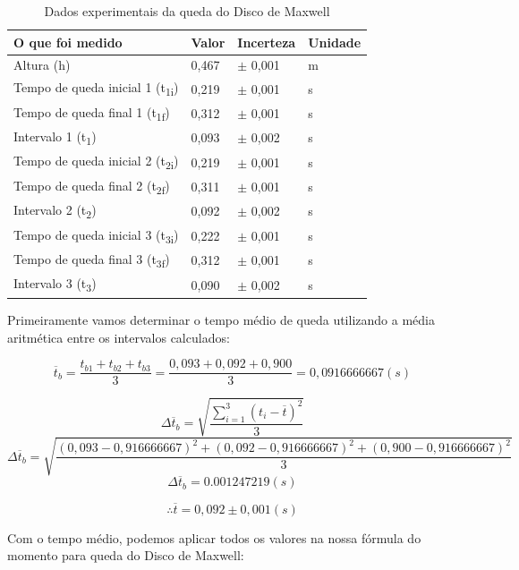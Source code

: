 \begin{table}[H]
    \centering
    \begin{tabular}{ |p{6cm}||p{2cm}||p{2cm}||p{2cm}|  }
        \hline
        \textbf{O que foi medido} & \textbf{Valor} & \textbf{Incerteza} & \textbf{Unidade}\\
        \hline
        Altura (h)                                      & 0,467 & $\pm$ 0,001 & m\\
        Tempo de queda inicial 1 (t\textsubscript{1i})  & 0,219 & $\pm$ 0,001 & s\\
        Tempo de queda final 1 (t\textsubscript{1f})    & 0,312 & $\pm$ 0,001 & s\\
        Intervalo 1 (t\textsubscript{1})                & 0,093 & $\pm$ 0,002 & s\\
        Tempo de queda inicial 2 (t\textsubscript{2i})  & 0,219 & $\pm$ 0,001 & s\\
        Tempo de queda final 2 (t\textsubscript{2f})    & 0,311 & $\pm$ 0,001 & s\\
        Intervalo 2 (t\textsubscript{2})                & 0,092 & $\pm$ 0,002 & s\\
        Tempo de queda inicial 3 (t\textsubscript{3i})  & 0,222 & $\pm$ 0,001 & s\\
        Tempo de queda final 3 (t\textsubscript{3f})    & 0,312 & $\pm$ 0,001 & s\\
        Intervalo 3 (t\textsubscript{3})                & 0,090 & $\pm$ 0,002 & s\\
        \hline
    \end{tabular}
    \caption{Dados experimentais da queda do Disco de Maxwell}
\end{table}

Primeiramente vamos determinar o tempo médio de queda utilizando a média aritmética entre os intervalos calculados:

\[\overline{t}_b = \frac{t_{b1} + t_{b2} + t_{b3}}{3} = \frac{0,093 + 0,092 + 0,900}{3} = 0,0916666667 (s)\]

\[\Delta \overline{t}_b = \sqrt{\frac{\sum_{i=1}^{3} (t_i - \overline{t})^2}{3}}\]
\[\Delta \overline{t}_b = \sqrt{\frac{(0,093-0,916666667)^2 + (0,092-0,916666667)^2 + (0,900-0,916666667)^2}{3}}\]
\[\Delta \overline{t}_b = 0.001247219 (s)\]

\[\therefore \overline{t} = 0,092 \pm 0,001 (s)\]

Com o tempo médio, podemos aplicar todos os valores na nossa fórmula do momento para queda do Disco de Maxwell:

